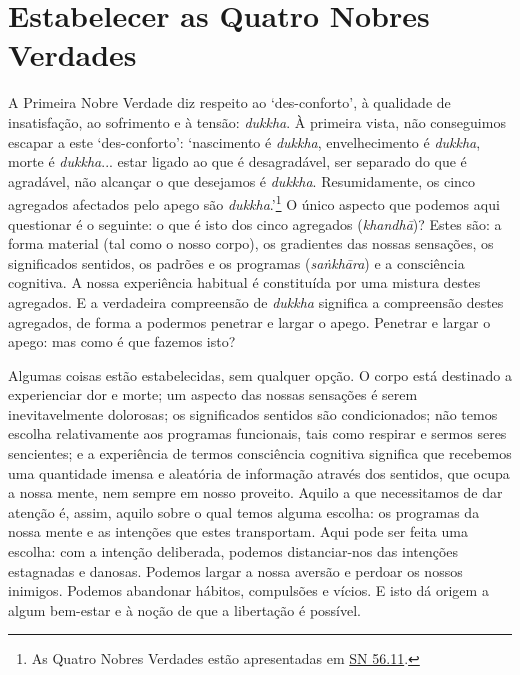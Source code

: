 \section{Estabelecer as Quatro Nobres Verdades}

A Primeira Nobre Verdade diz respeito ao `des-conforto', à qualidade de insatisfação, ao sofrimento e à tensão: \emph{dukkha}. À primeira vista, não conseguimos escapar a este `des-conforto': `nascimento é \emph{dukkha}, envelhecimento é \emph{dukkha}, morte é \emph{dukkha}... estar ligado ao que é desagradável, ser separado do que é agradável, não alcançar o que desejamos é \emph{dukkha}. Resumidamente, os cinco agregados afectados pelo apego são \emph{dukkha}.'\footnote{As Quatro Nobres Verdades estão apresentadas em \href{https://suttacentral.net/sn56.11/en/bodhi}{SN 56.11}.} O único aspecto que podemos aqui questionar é o seguinte: o que é isto dos cinco agregados (\emph{khandhā})? Estes são: a forma material (tal como o nosso corpo), os gradientes das nossas sensações, os significados sentidos, os padrões e os programas (\emph{saṅkhāra}) e a consciência cognitiva. A nossa experiência habitual é constituída por uma mistura destes agregados. E a verdadeira compreensão de \emph{dukkha} significa a compreensão destes agregados, de forma a podermos penetrar e largar o apego. Penetrar e largar o apego: mas como é que fazemos isto?

Algumas coisas estão estabelecidas, sem qualquer opção. O corpo está destinado a experienciar dor e morte; um aspecto das nossas sensações é serem inevitavelmente dolorosas; os significados sentidos são condicionados; não temos escolha relativamente aos programas funcionais, tais como respirar e sermos seres sencientes; e a experiência de termos consciência cognitiva significa que recebemos uma quantidade imensa e aleatória de informação através dos sentidos, que ocupa a nossa mente, nem sempre em nosso proveito. Aquilo a que necessitamos de dar atenção é, assim, aquilo sobre o qual temos alguma escolha: os programas da nossa mente e as intenções que estes transportam. Aqui pode ser feita uma escolha: com a intenção deliberada, podemos distanciar-nos das intenções estagnadas e danosas. Podemos largar a nossa aversão e perdoar os nossos inimigos. Podemos abandonar hábitos, compulsões e vícios. E isto dá origem a algum bem-estar e à noção de que a libertação é possível.

